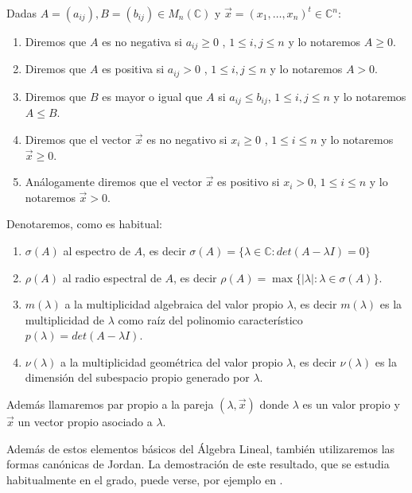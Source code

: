 \documentclass[size=a4, parskip=half, titlepage=false, toc=flat, toc=bib, 12pt]{scrartcl}
\theoremstyle{theorem-style}
\theoremstyle{definition-style}
\theoremstyle{remark-style}
\theoremstyle{example-style}
\theoremstyle{definition-style}
\theoremstyle{remark-style}
\begin{document}
Dadas $A = (a_{ij}),B = (b_{ij}) \in M_n(\mathbb{C})$ y $\vec{x} = (x_1, \dots, x_n)^t\in \mathbb{C}^n$:
\begin{enumerate}
\item Diremos que $A$ es no negativa si $a_{ij}\geq 0$ , $1 \leq i,j \leq n$ y lo notaremos
$A\geq 0$.
\item Diremos que $A$ es positiva si $a_{ij} > 0$ , $1 \leq i, j \leq n$ y lo notaremos $A > 0$.
\item Diremos que $B$ es mayor o igual que $A$ si $a_{ij} \leq b_{ij}$, $1 \leq i,j \leq n$ y lo notaremos $A \leq B$.
\item Diremos que el vector $\vec{x}$ es no negativo si $x_i \geq 0$ , $1 \leq i \leq n$ y lo notaremos $\vec{x} \geq 0$.
\item Análogamente diremos que el vector $\vec{x}$ es positivo si $x_i > 0$, $1 \leq i \leq n$ y lo notaremos $\vec{x} > 0$.
\end{enumerate}

Denotaremos, como es habitual:
\begin{enumerate}
\item $\sigma (A)$ al espectro de $A$, es decir $\sigma(A) = \{ \lambda \in \mathbb{C} : det(A - \lambda I)= 0\}$
\item $\rho(A)$ al radio espectral de $A$, es decir $\rho(A) = \max\{|\lambda| : \lambda \in \sigma(A) \}$.
\item $m(\lambda)$ a la multiplicidad algebraica del valor propio $\lambda$, es decir $m(\lambda)$ es la multiplicidad de $\lambda$ como raíz del polinomio característico $p(\lambda) = det(A - \lambda I)$.
\item $\nu(\lambda)$ a la multiplicidad geométrica del valor propio $\lambda$, es decir $\nu(\lambda)$ es la dimensión del subespacio propio generado por $\lambda$.
\end{enumerate}

Además llamaremos par propio a la pareja $(\lambda, \vec{x})$ donde $\lambda$ es un valor propio y $\vec{x}$ un vector propio asociado a $\lambda$.

Además de estos elementos básicos del Álgebra Lineal, también utilizaremos las formas canónicas de Jordan. La demostración de este resultado, que se estudia habitualmente en el grado, puede verse, por ejemplo en \cite{jordan}.
\end{document}
